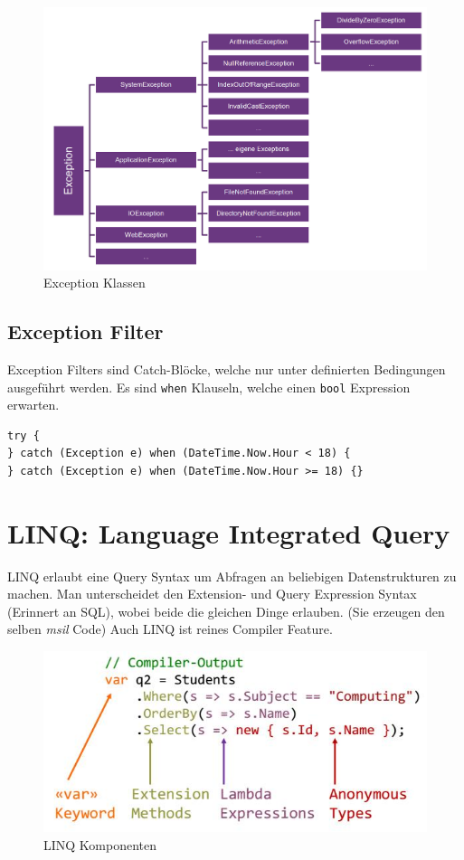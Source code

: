 \documentclass[
a4paper,
oneside,
10pt,
fleqn,
headsepline,
toc=listofnumbered, 
bibliography=totocnumbered]{scrartcl}
\let\stdsection\section
\renewcommand\section{\clearpage\stdsection}
\begin{document}
\begin{figure}[ht]
	\centering
	\includegraphics[width=\linewidth]{images/exception_classes}
	\caption{Exception Klassen}
	\label{fig:exceptionclasses}
\end{figure}

\subsection{Exception Filter}
Exception Filters sind Catch-Blöcke, welche nur unter definierten Bedingungen ausgeführt werden. Es sind \lstinline|when| Klauseln, welche einen \lstinline|bool| Expression erwarten.
\begin{lstlisting}
try {
} catch (Exception e) when (DateTime.Now.Hour < 18) {
} catch (Exception e) when (DateTime.Now.Hour >= 18) {}
\end{lstlisting}


\section{LINQ: Language Integrated Query}
LINQ erlaubt eine Query Syntax um Abfragen an beliebigen Datenstrukturen zu machen. Man unterscheidet den Extension- und Query Expression Syntax (Erinnert an SQL), wobei beide die gleichen Dinge erlauben. (Sie erzeugen den selben \textit{msil} Code) Auch LINQ ist reines Compiler Feature.

\begin{figure}[ht]
	\centering
	\includegraphics[width=0.7\linewidth]{images/linq_components}
	\caption{LINQ Komponenten}
	\label{fig:linqcomponents}
\end{figure}
\end{document}
